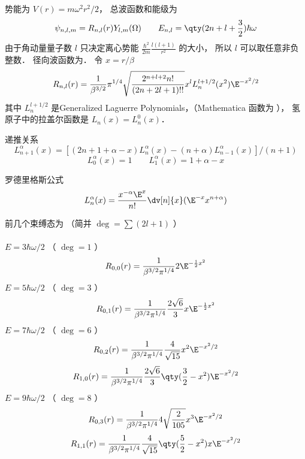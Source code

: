 

势能为 $V(r) = m\omega^2 r^2/2$，  总波函数和能级为
\begin{equation}
\psi_{n,l,m} = R_{n,l}(r) Y_{l,m}(\Omega)
\qquad
E_{n,l} = \qty(2n + l + \frac32) \hbar \omega
\end{equation}    
由于角动量量子数 $l$ 只决定离心势能 $\frac{\hbar^2}{2m} \frac{l(l + 1)}{r^2}$  的大小， 所以 $l$ 可以取任意非负整数． 径向波函数为． 令 $x = r/\beta $
\begin{equation}
R_{n,l}(r) = \frac{1}{\beta^{3/2}} \pi^{1/4} \sqrt{\frac{2^{n+l+2} n!}{(2n + 2l + 1)!!}} x^l L_n^{l+1/2}(x^2) \E^{-x^2/2}
\end{equation}
其中 $L_n^{l+1/2}$ 是Generalized Laguerre Polynomials，（Mathematica 函数为
）， 氢原子中的拉盖尔函数是 $L_n(x) = L_n^0(x)$． 

递推关系
\begin{equation}
L_{n+1}^\alpha (x) = [(2n + 1 + \alpha  - x)L_n^\alpha (x) - (n + \alpha )L_{n - 1}^\alpha (x)]/(n + 1)
\end{equation}
\begin{equation}
L_0^\alpha (x) = 1
\qquad
L_1^\alpha (x) = 1 + \alpha  - x
\end{equation}
    
罗德里格斯公式
\begin{equation}
L_n^\alpha (x) = \frac{x^{-\alpha} \E^x}{n!} \dv[n]{x} (\E^{-x} x^{n+\alpha})
\end{equation}

前几个束缚态为 （简并 $\deg  = \sum (2l + 1)$ ）\\ \\
$E = 3\hbar \omega /2$ （ $\deg  = 1$ ）
\begin{equation}
R_{0,0}(r) = \frac{1}{\beta^{3/2} \pi^{1/4}} 2\E^{-\frac12 x^2}
\end{equation}
$E = 5\hbar \omega /2$ （ $\deg  = 3$ ）
\begin{equation}
R_{0,1}(r) = \frac{1}{\beta^{3/2} \pi^{1/4}} \frac{2\sqrt 6}{3} x \E^{-\frac12 x^2}
\end{equation}
$E = 7\hbar \omega /2$ （ $\deg  = 6$ ）
\begin{equation}
R_{0,2}(r) = \frac{1}{\beta^{3/2} \pi^{1/4}} \frac{4}{\sqrt{15}} x^2 \E^{- x^2/2}
\end{equation}
\begin{equation}
R_{1,0}(r) = \frac{1}{\beta^{3/2} \pi^{1/4}} \frac{2\sqrt 6}{3} \qty(\frac32 - x^2) \E^{-x^2/2}
\end{equation}
$E = 9\hbar\omega /2$ （ $\deg  = 8$ ）
\begin{equation}
R_{0,3}(r) = \frac{1}{\beta^{3/2} \pi^{1/4}} 4\sqrt{\frac{2}{105}} x^3 \E^{-x^2/2}
\end{equation}
\begin{equation}
R_{1,1}(r) = \frac{1}{\beta^{3/2} \pi^{1/4}} \frac{4}{\sqrt{15}} \qty(\frac52 - x^2) x \E^{-x^2/2}
\end{equation}

 
